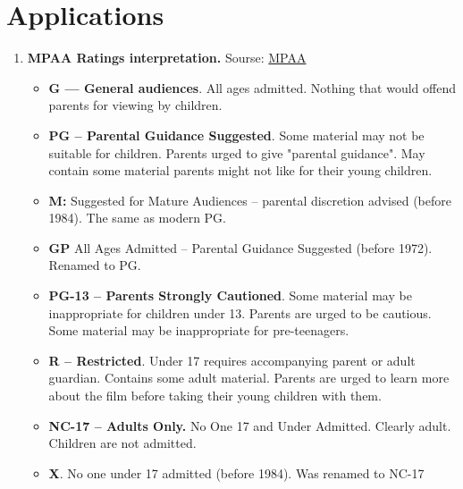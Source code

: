 \documentclass[a4paper,14pt]{article}
\begin{document}
    \section{Applications}
    
\begin{enumerate}
\item \textbf{MPAA Ratings interpretation. }\label{MPAA}
Sourse: \href{https://en.wikipedia.org/wiki/Motion_Picture_Association_of_America_film_rating_system#From_M_to_GP_to_PG}{MPAA}
\begin{itemize}
\item \textbf{G — General audiences}. All ages admitted. Nothing that would offend parents for viewing by children.
\item \textbf{PG – Parental Guidance Suggested}. Some material may not be suitable for children. Parents urged to give "parental guidance". May contain some material parents might not like for their young children.
\item \textbf{M:} Suggested for Mature Audiences – parental discretion advised (before 1984). The same as modern PG. 
\item \textbf{GP} All Ages Admitted – Parental Guidance Suggested (before 1972). Renamed to PG.
\item \textbf{PG-13 – Parents Strongly Cautioned}. Some material may be inappropriate for children under 13. Parents are urged to be cautious. Some material may be inappropriate for pre-teenagers.
\item \textbf{R – Restricted}. Under 17 requires accompanying parent or adult guardian. Contains some adult material. Parents are urged to learn more about the film before taking their young children with them.
\item \textbf{NC-17 – Adults Only. }No One 17 and Under Admitted. Clearly adult. Children are not admitted.
\item \textbf{X}. No one under 17 admitted (before 1984). Was renamed to NC-17
\end{itemize}

\end{enumerate}
\end{document}

